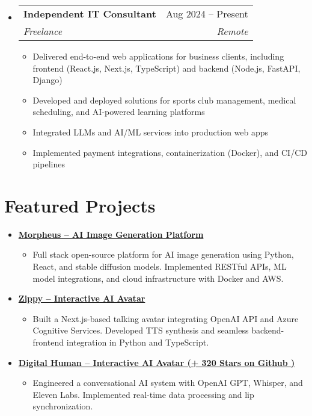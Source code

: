 \documentclass[letterpaper,11pt]{article}
\makeatletter
\newcommand{\resumeSubheading}[4]{
  \vspace{-2pt}
  \item[]
  \begin{tabular*}{\textwidth}{@{\extracolsep{\fill}}l r}
    \textbf{#1} & #2 \\
    \textit{#3} & \textit{#4} \\
  \end{tabular*}
  \vspace{-5pt}
}
\newcommand{\normalfaExternalLink}{{\mdseries\faExternalLink}}
\makeatother
\begin{document}
\begin{itemize}[leftmargin=0pt, itemindent=0pt, label={}]
\resumeSubheading
{Independent IT Consultant}{Aug 2024 -- Present}
{Freelance}{Remote}
\begin{itemize}[leftmargin=*]
    \item Delivered end-to-end web applications for business clients, including frontend (React.js, Next.js, TypeScript) and backend (Node.js, FastAPI, Django)
    \item Developed and deployed solutions for sports club management, medical scheduling, and AI-powered learning platforms
    \item Integrated LLMs and AI/ML services into production web apps
    \item Implemented payment integrations, containerization (Docker), and CI/CD pipelines
\end{itemize}
\end{itemize}
\newpage
\section{Featured Projects}
\begin{itemize}[leftmargin=*]
    \item \textbf{\href{https://github.com/Monadical-SAS/Morpheus}{Morpheus -- AI Image Generation Platform \normalfaExternalLink}}
    \begin{itemize}
        \item Full stack open-source platform for AI image generation using Python, React, and stable diffusion models. Implemented RESTful APIs, ML model integrations, and cloud infrastructure with Docker and AWS.
    \end{itemize}
    \item \textbf{\href{https://github.com/asanchezyali/ai-avatar}{Zippy -- Interactive AI Avatar \normalfaExternalLink}}
    \begin{itemize}
        \item Built a Next.js-based talking avatar integrating OpenAI API and Azure Cognitive Services. Developed TTS synthesis and seamless backend-frontend integration in Python and TypeScript.
    \end{itemize}
    \item \textbf{\href{https://github.com/asanchezyali/talking-avatar-with-ai}{Digital Human -- Interactive AI Avatar (+
        320 Stars on Github )\normalfaExternalLink}}
    \begin{itemize}
        \item Engineered a conversational AI system with OpenAI GPT, Whisper, and Eleven Labs. Implemented real-time data processing and lip synchronization.
    \end{itemize}
\end{itemize}
\end{document}
